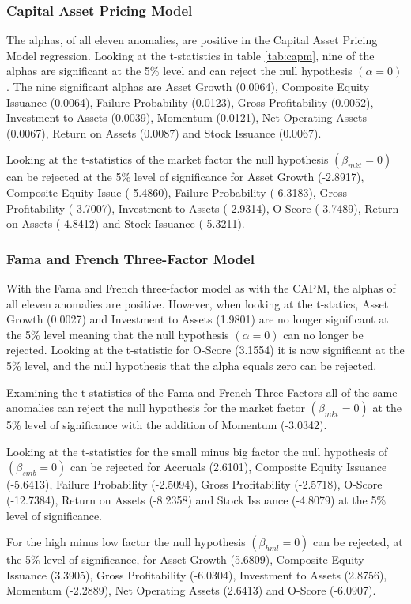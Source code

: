 \documentclass[12pt, a4paper, oneside]{article}
\begin{document}
\subsubsection{Capital Asset Pricing Model}
The alphas, of all eleven anomalies, are positive in the Capital Asset Pricing Model regression. Looking at the t-statistics in table \ref{tab:capm}, nine of the alphas are significant at the 5\% level and can reject the null hypothesis $(\alpha=0)$. The nine significant alphas are Asset Growth (0.0064), Composite Equity Issuance (0.0064), Failure Probability (0.0123), Gross Profitability (0.0052), Investment to Assets (0.0039), Momentum (0.0121), Net Operating Assets (0.0067), Return on Assets (0.0087) and Stock Issuance (0.0067).

Looking at the t-statistics of the market factor the null hypothesis $(\beta_{mkt}= 0)$ can be rejected at the 5\% level of significance for Asset Growth (-2.8917), Composite Equity Issue (-5.4860), Failure Probability (-6.3183), Gross Profitability (-3.7007), Investment to Assets (-2.9314), O-Score (-3.7489), Return on Assets (-4.8412) and Stock Issuance (-5.3211). 

\subsubsection{Fama and French Three-Factor Model}
With the Fama and French three-factor model as with the CAPM, the alphas of all eleven anomalies are positive. However, when looking at the t-statics, Asset Growth (0.0027) and Investment to Assets (1.9801) are no longer significant at the 5\% level meaning that the null hypothesis $(\alpha=0)$ can no longer be rejected. Looking at the t-statistic for O-Score (3.1554) it is now significant at the 5\% level, and the null hypothesis that the alpha equals zero can be rejected. 

Examining the t-statistics of the Fama and French Three Factors all of the same anomalies can reject the null hypothesis for the market factor $(\beta_{mkt}= 0)$ at the 5\% level of significance with the addition of Momentum (-3.0342). 

Looking at the t-statistics for the small minus big factor the null hypothesis of $(\beta_{smb}= 0)$ can be rejected for Accruals (2.6101), Composite Equity Issuance (-5.6413), Failure Probability (-2.5094), Gross Profitability (-2.5718), O-Score (-12.7384), Return on Assets (-8.2358) and Stock Issuance (-4.8079) at the 5\% level of significance. 

For the high minus low factor the null hypothesis $(\beta_{hml}= 0)$ can be rejected, at the 5\% level of significance, for Asset Growth (5.6809), Composite Equity Issuance (3.3905), Gross Profitability (-6.0304), Investment to Assets (2.8756), Momentum (-2.2889), Net Operating Assets (2.6413) and O-Score (-6.0907).
\end{document}
